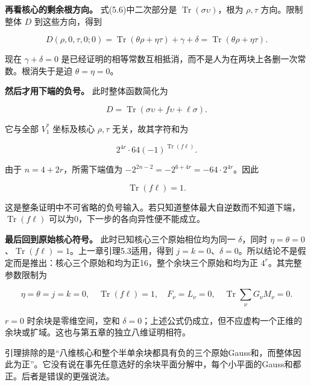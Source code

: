 \documentclass[UTF8,fontset=fandol,zihao=-4,openany,oneside]{ctexbook}
\begin{document}
\textbf{再看核心的剩余根方向。} 式(5.6)中二次部分是 \(\operatorname{Tr}(\sigma\upsilon)\)，根为 \(\rho,\tau\) 方向。限制整体 \(D\) 到这些方向，得到



\[
D(\rho,0,\tau,0;0)
=\operatorname{Tr}(\theta\rho+\eta\tau)+\gamma+\delta
=\operatorname{Tr}(\theta\rho+\eta\tau).
\]



现在 \(\gamma+\delta=0\) 是已经证明的相等常数互相抵消，而不是人为在两块上各删一次常数。根消失于是迫 \(\theta=\eta=0\)。



\textbf{然后才用下端的负号。} 此时整体函数简化为



\[
D=\operatorname{Tr}(\sigma\upsilon+f\upsilon+\ell\sigma).
\]



它与全部 \(V_1^*\) 坐标及核心 \(\rho,\tau\) 无关，故其字符和为



\[
2^{4r}\cdot64(-1)^{\operatorname{Tr}(f\ell)}.
\]



由于 \(n=4+2r\)，所需下端值为 \(-2^{2n-2}=-2^{6+4r}=-64\cdot2^{4r}\)。因此



\[
\operatorname{Tr}(f\ell)=1.
\]



这是整条证明中不可省略的负号输入。若只知道整体最大自逆数而不知道下端，\(\operatorname{Tr}(f\ell)\) 可以为0，下一步的各向异性便不能成立。



\textbf{最后回到原始核心符号。} 此时已知核心三个原始相位均为同一 \(\delta\)，同时 \(\eta=\theta=0\)、\(\operatorname{Tr}(f\ell)=1\)。上一章引理5.3适用，得到 \(j=k=0\)、\(\delta=0\)。所以结论不是假定而是推出：核心三个原始和均为正16，整个余块三个原始和均为正 \(4^r\)。其完整参数限制为



\[
\eta=\theta=j=k=0,\quad\operatorname{Tr}(f\ell)=1,
\quad F_\nu=L_\nu=0,
\quad\operatorname{Tr}\sum_\nu G_\nu M_\nu=0.
\]



\(r=0\) 时余块是零维空间，空和 \(\delta=0\)；上述公式仍成立，但不应虚构一个正维的余块或扩域。这也与第五章的独立八维证明相符。



引理排除的是“八维核心和整个半单余块都具有负的三个原始Gauss和，而整体因此为正”。它没有说在事先任意选好的余块平面分解中，每个小平面的Gauss和都正。后者是错误的更强说法。
\end{document}
